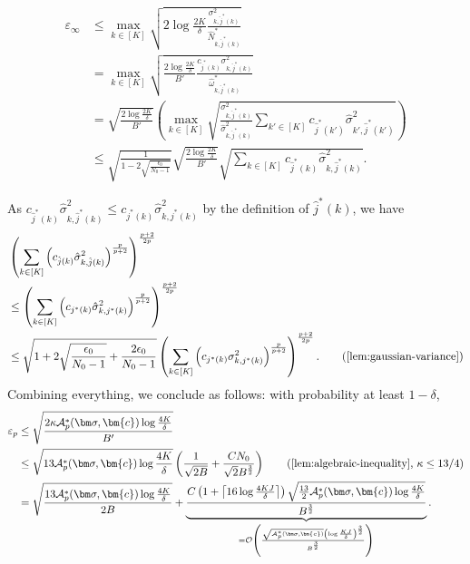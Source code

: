 \documentclass{article}
\def\vc{{\bm{c}}}
\def\gA{{\mathcal{A}}}
\def\gO{{\mathcal{O}}}
\theoremstyle{plain}
\theoremstyle{definition}
\theoremstyle{plain}
\begin{document}
\begin{align}
    \varepsilon_\infty & \leq \max_{k\in[K]} \sqrt{2\log \frac{2K}{\delta} \frac{\sigma_{k,\hat{j}^*(k)}^2}{\widehat{N}_{k,\hat{j}^*(k)}^*}} \\
    & = \max_{k\in[K]} \sqrt{\frac{2\log \frac{2K}{\delta}}{B'} \frac{c_{\hat{j}^*(k)}\sigma_{k,\hat{j}^*(k)}^2}{\widehat{\omega}_{k,\hat{j}^*(k)}^*}}\\
    & = \sqrt{\frac{2\log \frac{2K}{\delta}}{B'}}\left( \max_{k\in[K]} \sqrt{\frac{\sigma_{k,\hat{j}^*(k)}^2}{\hat{\sigma}_{k,\hat{j}^*(k)}^2} \sum_{k'\in[K]} c_{\hat{j}^*(k')} \hat{\sigma}_{k', \hat{j}^*(k')}^2 }\right)\\
    & \leq \sqrt{\frac{1}{1 - 2\sqrt{\frac{\epsilon_0}{N_0-1}}}} \sqrt{\frac{2\log\frac{2K}{\delta}}{B'}}\sqrt{\sum_{k\in[K]} c_{\hat{j}^*(k)} \hat{\sigma}_{k, \hat{j}^*(k)}^2 }.
\end{align}


As $c_{\hat{j}^*(k)} \hat{\sigma}_{k, \hat{j}^*(k)}^2 \leq c_{j^*(k)} \hat{\sigma}_{k,j^*(k)}^2$ by the definition of $\hat{j}^*(k)$, we have
\begin{align}
    &\left( \sum_{k\in[K]} \left( c_{\hat{j}(k)} \hat{\sigma}_{k,\hat{j}(k)}^2 \right)^{\frac{p}{p+2}} \right)^{\frac{p+2}{2p}} \\
    &\leq \left( \sum_{k\in[K]} \left( c_{j^*(k)} \hat{\sigma}_{k,j^*(k)}^2 \right)^{\frac{p}{p+2}} \right)^{\frac{p+2}{2p}}\\
    & \leq \sqrt{1 + 2\sqrt{\frac{\epsilon_0}{N_0-1}} + \frac{2\epsilon_0}{N_0-1}} \left( \sum_{k\in[K]} \left( c_{j^*(k)} \sigma_{k,j^*(k)}^2 \right)^{\frac{p}{p+2}} \right)^{\frac{p+2}{2p}}. \tag{\Cref{lem:gaussian-variance}}
\end{align}
Combining everything, we conclude as follows: with probability at least $1 - \delta$,
\begin{align}
    \varepsilon_p & \leq \sqrt{\frac{2\kappa \gA_p^*(\bm\sigma, \vc) \log\frac{4K}{\delta}}{B'}}\\
    & \leq \sqrt{13 \gA_p^*(\bm\sigma, \vc) \log\frac{4K}{\delta}} \left( \frac{1}{\sqrt{2 B}} + \frac{CN_0}{\sqrt{2} B^{\frac{3}{2}}}\right) \tag{\Cref{lem:algebraic-inequality}, $\kappa \leq 13/4$} \\
    &= \sqrt{\frac{13\gA_p^*(\bm\sigma, \vc) \log \frac{4K}{\delta}}{2B}} + \underbrace{\frac{C \left(1 + \left\lceil 16 \log \frac{4KJ}{\delta}\right\rceil \right) \sqrt{\frac{13}{2}\gA_p^*(\bm\sigma,\vc)\log \frac{4K}{\delta}}}{B^{\frac{3}{2}}}}_{= \gO \left( \frac{\sqrt{\gA_p^*(\bm\sigma, \vc)} \left(\log \frac{KJ}{\delta}\right)^{\frac{3}{2}}}{B^{\frac{3}{2}}}\right)}.
\end{align}
\end{document}

